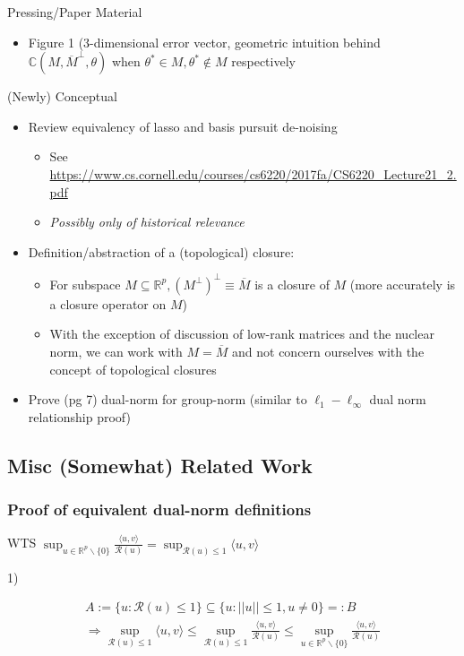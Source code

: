 \documentclass[11pt]{article}
\begin{document}
	Pressing/Paper Material 
	\begin{itemize}	
		\item Figure 1 (3-dimensional error vector, geometric intuition behind $\mathbb{C}(M, \overline{M}^\perp, \theta)$ when $\theta^* \in M, \theta^*\not\in M$ respectively 
	\end{itemize}
	(Newly) Conceptual
	\begin{itemize}
		\item Review equivalency of lasso and basis pursuit de-noising
		\begin{itemize}
			\item See \url{https://www.cs.cornell.edu/courses/cs6220/2017fa/CS6220_Lecture21_2.pdf}
			\item {\it Possibly only of historical relevance}
        \end{itemize}
		\item Definition/abstraction of a (topological) closure:
		\begin{itemize}
			\item For subspace $M \subseteq \mathbb{R}^p, \left(M^\perp \right)^\perp \equiv \overline{M}$ is a closure of $M$ (more accurately is a closure operator on $M$) 
			\item With the exception of discussion of low-rank matrices and the nuclear norm, we can work with $M = \overline{M}$ and not concern ourselves with the concept of topological closures 
        \end{itemize}
		\item Prove (pg 7) dual-norm for group-norm (similar to $\ell_1 - \ell_\infty$ dual norm relationship proof)
	\end{itemize}
	
\subsection*{Misc (Somewhat) Related Work}

\subsubsection{Proof of equivalent dual-norm definitions}

WTS $\sup_{u \in \mathbb{R}^p\backslash\{0\} } \frac{\langle u, v \rangle}{\mathcal{R}(u)} = \sup_{\mathcal{R}(u)\leq 1} \langle u,v \rangle$

1) 

\begin{gather*}
	A := \{u : \mathcal{R}(u) \leq 1\} \subseteq \{u : ||u|| \leq 1, u \neq 0\} =: B 
	\\
	\Rightarrow 
	\sup_{\mathcal{R}(u)\leq 1} \langle u,v \rangle 
	\leq 
	\sup_{\mathcal{R}(u)\leq 1}\frac{\langle u,v \rangle}{\mathcal{R}(u)}
	\leq 
	\sup_{u \in \mathbb{R}^p\backslash\{0\} } \frac{\langle u, v \rangle}{\mathcal{R}(u)}
\end{gather*}
\end{document}
